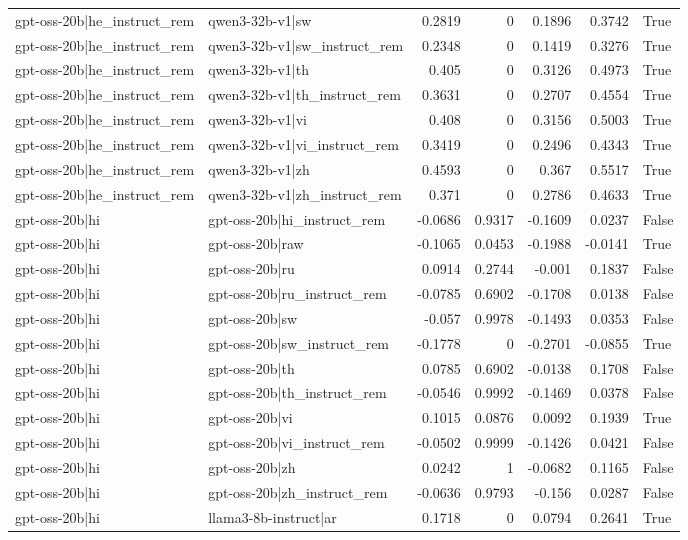 \begin{table}
\begin{tabular}{l l r r r r l}
gpt-oss-20b|he_instruct_rem & qwen3-32b-v1|sw & 0.2819 & 0 & 0.1896 & 0.3742 & True \\
gpt-oss-20b|he_instruct_rem & qwen3-32b-v1|sw_instruct_rem & 0.2348 & 0 & 0.1419 & 0.3276 & True \\
gpt-oss-20b|he_instruct_rem & qwen3-32b-v1|th & 0.405 & 0 & 0.3126 & 0.4973 & True \\
gpt-oss-20b|he_instruct_rem & qwen3-32b-v1|th_instruct_rem & 0.3631 & 0 & 0.2707 & 0.4554 & True \\
gpt-oss-20b|he_instruct_rem & qwen3-32b-v1|vi & 0.408 & 0 & 0.3156 & 0.5003 & True \\
gpt-oss-20b|he_instruct_rem & qwen3-32b-v1|vi_instruct_rem & 0.3419 & 0 & 0.2496 & 0.4343 & True \\
gpt-oss-20b|he_instruct_rem & qwen3-32b-v1|zh & 0.4593 & 0 & 0.367 & 0.5517 & True \\
gpt-oss-20b|he_instruct_rem & qwen3-32b-v1|zh_instruct_rem & 0.371 & 0 & 0.2786 & 0.4633 & True \\
gpt-oss-20b|hi & gpt-oss-20b|hi_instruct_rem & -0.0686 & 0.9317 & -0.1609 & 0.0237 & False \\
gpt-oss-20b|hi & gpt-oss-20b|raw & -0.1065 & 0.0453 & -0.1988 & -0.0141 & True \\
gpt-oss-20b|hi & gpt-oss-20b|ru & 0.0914 & 0.2744 & -0.001 & 0.1837 & False \\
gpt-oss-20b|hi & gpt-oss-20b|ru_instruct_rem & -0.0785 & 0.6902 & -0.1708 & 0.0138 & False \\
gpt-oss-20b|hi & gpt-oss-20b|sw & -0.057 & 0.9978 & -0.1493 & 0.0353 & False \\
gpt-oss-20b|hi & gpt-oss-20b|sw_instruct_rem & -0.1778 & 0 & -0.2701 & -0.0855 & True \\
gpt-oss-20b|hi & gpt-oss-20b|th & 0.0785 & 0.6902 & -0.0138 & 0.1708 & False \\
gpt-oss-20b|hi & gpt-oss-20b|th_instruct_rem & -0.0546 & 0.9992 & -0.1469 & 0.0378 & False \\
gpt-oss-20b|hi & gpt-oss-20b|vi & 0.1015 & 0.0876 & 0.0092 & 0.1939 & True \\
gpt-oss-20b|hi & gpt-oss-20b|vi_instruct_rem & -0.0502 & 0.9999 & -0.1426 & 0.0421 & False \\
gpt-oss-20b|hi & gpt-oss-20b|zh & 0.0242 & 1 & -0.0682 & 0.1165 & False \\
gpt-oss-20b|hi & gpt-oss-20b|zh_instruct_rem & -0.0636 & 0.9793 & -0.156 & 0.0287 & False \\
gpt-oss-20b|hi & llama3-8b-instruct|ar & 0.1718 & 0 & 0.0794 & 0.2641 & True \\

\end{tabular}
\end{table}
